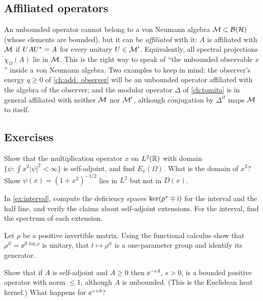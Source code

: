 \subsection{Affiliated operators}

An unbounded operator cannot belong to a von Neumann algebra $\mathcal{M}\subset\mathcal{B}(\mathcal{H})$ (whose elements are bounded), but it can be \emph{affiliated} with it: $A$ is affiliated with $\mathcal{M}$ if $UAU^{*}=A$ for every unitary $U\in\mathcal{M}'$. Equivalently, all spectral projections $\chi_\Omega(A)$ lie in $\mathcal{M}$. This is the right way to speak of ``the unbounded observable $x$'' inside a von Neumann algebra. Two examples to keep in mind: the observer's energy $q\ge0$ of \cref{ch:add_observer} will be an unbounded operator affiliated with the algebra of the observer; and the modular operator $\Delta$ of \cref{ch:tomita} is in general affiliated with neither $\mathcal{M}$ nor $\mathcal{M}'$, although conjugation by $\Delta^{it}$ maps $\mathcal{M}$ to itself.

\subsection*{Exercises}
\begin{exercise}\label{ex:spectral:1}
Show that the multiplication operator $x$ on $L^2(\mathbb{R})$ with domain $\{\psi:\int x^2|\psi|^2<\infty\}$ is self-adjoint, and find $E_x(\Omega)$. What is the domain of $x^2$? Show $\psi(x)=(1+x^2)^{-1/2}$ lies in $L^2$ but not in $D(x)$.
\end{exercise}
\begin{exercise}\label{ex:spectral:2}
In \cref{ex:interval}, compute the deficiency spaces $\ker(p^{*}\mp\mathrm{i})$ for the interval and the half line, and verify the claims about self-adjoint extensions. For the interval, find the spectrum of each extension.
\end{exercise}
\begin{exercise}\label{ex:spectral:3}
Let $\rho$ be a positive invertible matrix. Using the functional calculus show that $\rho^{it}=\ee^{\ii t\log\rho}$ is unitary, that $t\mapsto\rho^{it}$ is a one-parameter group and identify its generator.
\end{exercise}
\begin{exercise}\label{ex:spectral:4}
Show that if $A$ is self-adjoint and $A\ge0$ then $\ee^{-sA}$, $s>0$, is a bounded positive operator with norm $\le1$, although $A$ is unbounded. (This is the Euclidean heat kernel.) What happens for $\ee^{+sA}$?
\end{exercise}

